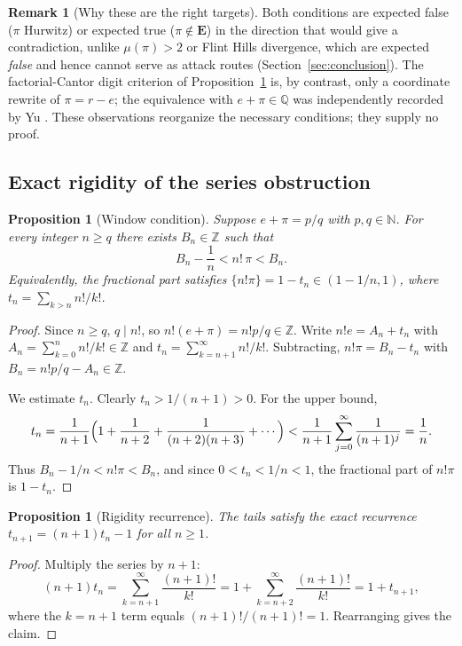 \documentclass[11pt]{amsart}
\newtheorem{proposition}[theorem]{Proposition}
\theoremstyle{definition}
\newtheorem{remark}[theorem]{Remark}
\theoremstyle{remark}
\numberwithin{equation}{section}
\newcommand{\Q}{\mathbb{Q}}
\newcommand{\Z}{\mathbb{Z}}
\newcommand{\N}{\mathbb{N}}
\newcommand{\irr}{\mu}
\begin{document}
\begin{remark}[Why these are the right targets]
Both conditions are expected false ($\pi$ Hurwitz) or expected true ($\pi\notin\mathbf{E}$) in the direction that would give a contradiction, unlike $\irr(\pi)>2$ or Flint Hills divergence, which are expected \emph{false} and hence cannot serve as attack routes (Section~\ref{sec:conclusion}). The factorial-Cantor digit criterion of Proposition~\ref{prop:window} is, by contrast, only a coordinate rewrite of $\pi=r-e$; the equivalence with $e+\pi\in\Q$ was independently recorded by Yu \cite{Yu2026}. These observations reorganize the necessary conditions; they supply no proof.
\end{remark}

\subsection{Exact rigidity of the series obstruction}

\begin{proposition}[Window condition]\label{prop:window}
Suppose $e+\pi=p/q$ with $p,q\in\N$. For every integer $n\ge q$ there exists $B_n\in\Z$ such that
\[
B_n-\frac1n<n!\,\pi<B_n.
\]
Equivalently, the fractional part satisfies $\{n!\pi\}=1-t_n\in(1-1/n,1)$, where $t_n=\sum_{k>n}n!/k!$.
\end{proposition}

\begin{proof}
Since $n\ge q$, $q\mid n!$, so $n!(e+\pi)=n!p/q\in\Z$. Write $n!e=A_n+t_n$ with $A_n=\sum_{k=0}^n n!/k!\in\Z$ and $t_n=\sum_{k=n+1}^\infty n!/k!$. Subtracting, $n!\pi=B_n-t_n$ with $B_n=n!p/q-A_n\in\Z$.

We estimate $t_n$. Clearly $t_n>1/(n+1)>0$. For the upper bound,
\[
t_n=\frac1{n+1}\Bigl(1+\frac1{n+2}+\frac1{(n+2)(n+3)}+\cdots\Bigr)
<\frac1{n+1}\sum_{j=0}^\infty\frac1{(n+1)^j}=\frac1n.
\]
Thus $B_n-1/n<n!\pi<B_n$, and since $0<t_n<1/n<1$, the fractional part of $n!\pi$ is $1-t_n$.
\end{proof}

\begin{proposition}[Rigidity recurrence]\label{prop:recurrence}
The tails satisfy the exact recurrence $t_{n+1}=(n+1)t_n-1$ for all $n\ge1$.
\end{proposition}

\begin{proof}
Multiply the series by $n+1$:
\[
(n+1)t_n=\sum_{k=n+1}^{\infty}\frac{(n+1)!}{k!}=1+\sum_{k=n+2}^{\infty}\frac{(n+1)!}{k!}=1+t_{n+1},
\]
where the $k=n+1$ term equals $(n+1)!/(n+1)!=1$. Rearranging gives the claim.
\end{proof}
\end{document}
